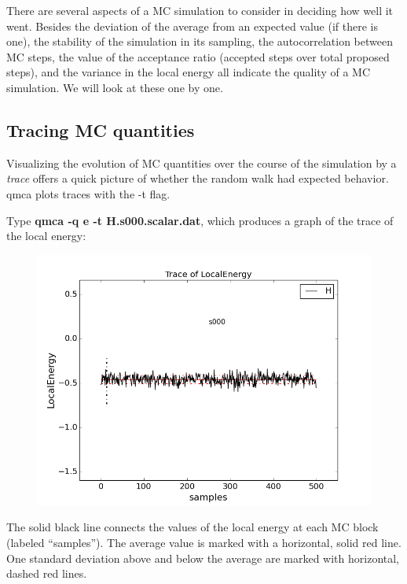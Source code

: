 There are several aspects of a MC simulation to consider in deciding how well
it went.  Besides the deviation of the average from an expected value (if there
is one), the stability of the simulation in its sampling, the autocorrelation
between MC steps, the value of the acceptance ratio (accepted steps over total
proposed steps), and the variance in the local energy all indicate the quality
of a MC simulation.  We will look at these one by one.

\subsection{Tracing MC quantities}

Visualizing the evolution of MC quantities over the course of the simulation by
a \textit{trace} offers a quick picture of whether the random walk had expected
behavior.  qmca plots traces with the -t flag.

Type \textbf{qmca -q e -t H.s000.scalar.dat}, which produces a graph of the
trace of the local energy:

\FloatBarrier
\begin{figure}[ht!]
\begin{center}
\includegraphics[trim = 0mm 0mm 0mm 0mm, clip,width=0.75\columnwidth]{figures/lab_qmc_statistics_tracing1.png}
\end{center}
\end{figure}
\FloatBarrier


The solid black line connects the values of the local energy at each MC block
(labeled ``samples'').  The average value is marked with a horizontal, solid
red line.  One standard deviation above and below the average are marked with
horizontal, dashed red lines.  


